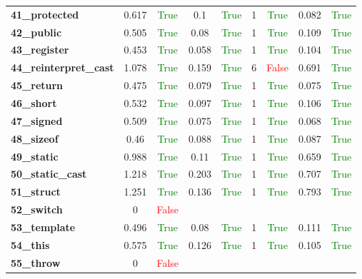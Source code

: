 \documentclass{article}
\begin{document}
\begin{xltabular}{\textwidth}{lcccccccc}
\textbf{41\_protected}& 0.617&\textcolor{green}{True}& 0.1&\textcolor{green}{True}& 1&\textcolor{green}{True}& 0.082&\textcolor{green}{True} \\[0.5ex]
\textbf{42\_public}& 0.505&\textcolor{green}{True}& 0.08&\textcolor{green}{True}& 1&\textcolor{green}{True}& 0.109&\textcolor{green}{True} \\[0.5ex]
\textbf{43\_register}& 0.453&\textcolor{green}{True}& 0.058&\textcolor{green}{True}& 1&\textcolor{green}{True}& 0.104&\textcolor{green}{True} \\[0.5ex]
\textbf{44\_reinterpret\_cast}& 1.078&\textcolor{green}{True}& 0.159&\textcolor{green}{True}& 6&\textcolor{red}{False}& 0.691&\textcolor{green}{True} \\[0.5ex]
\textbf{45\_return}& 0.475&\textcolor{green}{True}& 0.079&\textcolor{green}{True}& 1&\textcolor{green}{True}& 0.075&\textcolor{green}{True} \\[0.5ex]
\textbf{46\_short}& 0.532&\textcolor{green}{True}& 0.097&\textcolor{green}{True}& 1&\textcolor{green}{True}& 0.106&\textcolor{green}{True} \\[0.5ex]
\textbf{47\_signed}& 0.509&\textcolor{green}{True}& 0.075&\textcolor{green}{True}& 1&\textcolor{green}{True}& 0.068&\textcolor{green}{True} \\[0.5ex]
\textbf{48\_sizeof}& 0.46&\textcolor{green}{True}& 0.088&\textcolor{green}{True}& 1&\textcolor{green}{True}& 0.087&\textcolor{green}{True} \\[0.5ex]
\textbf{49\_static}& 0.988&\textcolor{green}{True}& 0.11&\textcolor{green}{True}& 1&\textcolor{green}{True}& 0.659&\textcolor{green}{True} \\[0.5ex]
\textbf{50\_static\_cast}& 1.218&\textcolor{green}{True}& 0.203&\textcolor{green}{True}& 1&\textcolor{green}{True}& 0.707&\textcolor{green}{True} \\[0.5ex]
\textbf{51\_struct}& 1.251&\textcolor{green}{True}& 0.136&\textcolor{green}{True}& 1&\textcolor{green}{True}& 0.793&\textcolor{green}{True} \\[0.5ex]
\textbf{52\_switch}& 0&\textcolor{red}{False} \\[0.5ex]
\textbf{53\_template}& 0.496&\textcolor{green}{True}& 0.08&\textcolor{green}{True}& 1&\textcolor{green}{True}& 0.111&\textcolor{green}{True} \\[0.5ex]
\textbf{54\_this}& 0.575&\textcolor{green}{True}& 0.126&\textcolor{green}{True}& 1&\textcolor{green}{True}& 0.105&\textcolor{green}{True} \\[0.5ex]
\textbf{55\_throw}& 0&\textcolor{red}{False} \\[0.5ex]

\end{xltabular}
\end{document}
